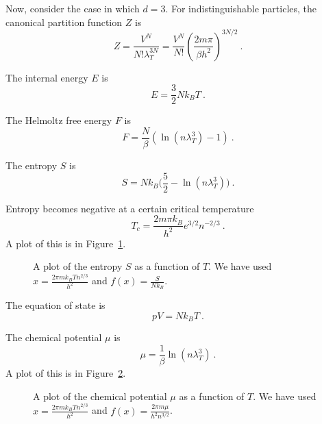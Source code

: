     Now, consider the case in which $d = 3$.
    For indistinguishable particles, the canonical partition function $Z$ is 
    \begin{equation*}
        Z = \frac{V^N}{N! \lambda^{3N}_T} = \frac{V^N}{N!} (\frac{2 m \pi}{\beta h^2})^{3N/2} ~.
    \end{equation*}
    
    The internal energy $E$ is 
    \begin{equation*}
        E = \frac{3}{2} N k_B T ~.
    \end{equation*}
    
    The Helmoltz free energy $F$ is 
    \begin{equation*}
        F = \frac{N}{\beta} (\ln (n \lambda_T^3) - 1) ~.
    \end{equation*}
    
    The entropy $S$ is 
    \begin{equation*}
        S = N k_B \Big ( \frac{5}{2} - \ln (n \lambda_T^3) \Big ) ~.
    \end{equation*}
    
    Entropy becomes negative at a certain critical temperature
    \begin{equation*}
        T_c = \frac{2 m \pi k_B}{h^2} e^{3/2} n^{-2/3} ~.
    \end{equation*}
    A plot of this is in Figure~\ref{can:ent}.
    \begin{figure}[h!]
        \centering
        \caption{A plot of the entropy $S$ as a function of $T$. We have used $x = \frac{2 \pi m k_B T n^{2/3}}{h^2}$ and $f(x) = \frac{S}{N k_B}$.}
        \label{can:ent}
    \end{figure}
    
    The equation of state is 
    \begin{equation*}
        p V = N k_B T ~.
    \end{equation*}
    
    The chemical potential $\mu$ is 
    \begin{equation*}
        \mu = \frac{1}{\beta} \ln (n \lambda_T^3) ~.
    \end{equation*}
    A plot of this is in Figure~\ref{can:mu}.
    \begin{figure}[h!]
        \centering
        \caption{A plot of the chemical potential $\mu$ as a function of $T$. We have used $x = \frac{2 \pi m k_B T n^{2/3}}{h^2}$ and $f(x) = \frac{2 \pi m \mu}{h^2 n^{3/2}}$.}
        \label{can:mu}
    \end{figure}
    
